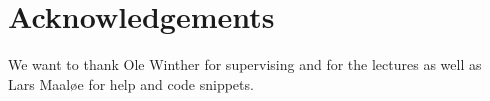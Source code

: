 \section{Acknowledgements}
\label{sec:acknowledgements}

We want to thank Ole Winther for supervising and for the lectures as well as Lars Maaløe for help and code snippets.

